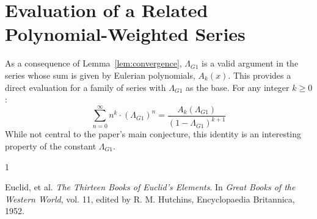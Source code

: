 \documentclass{amsart}
\theoremstyle{plain}
\theoremstyle{definition}
\theoremstyle{remark}
\newcommand{\LambdaG}{\Lambda_{G1}}
\begin{document}
\section{Evaluation of a Related Polynomial-Weighted Series}
As a consequence of Lemma~\ref{lem:convergence}, $\LambdaG$ is a valid argument in the series whose sum is given by Eulerian polynomials, $A_k(x)$. This provides a direct evaluation for a family of series with $\LambdaG$ as the base. For any integer $k \ge 0$:
$$ \sum_{n=0}^{\infty} n^k \cdot (\LambdaG)^n = \frac{A_k(\LambdaG)}{(1-\LambdaG)^{k+1}} $$
While not central to the paper's main conjecture, this identity is an interesting property of the constant $\LambdaG$.

\begin{thebibliography}{1}

Euclid, et al. \textit{The Thirteen Books of Euclid's Elements}. In \textit{Great Books of the Western World}, vol. 11, edited by R. M. Hutchins, Encyclopaedia Britannica, 1952. 

\end{thebibliography}
\end{document}
